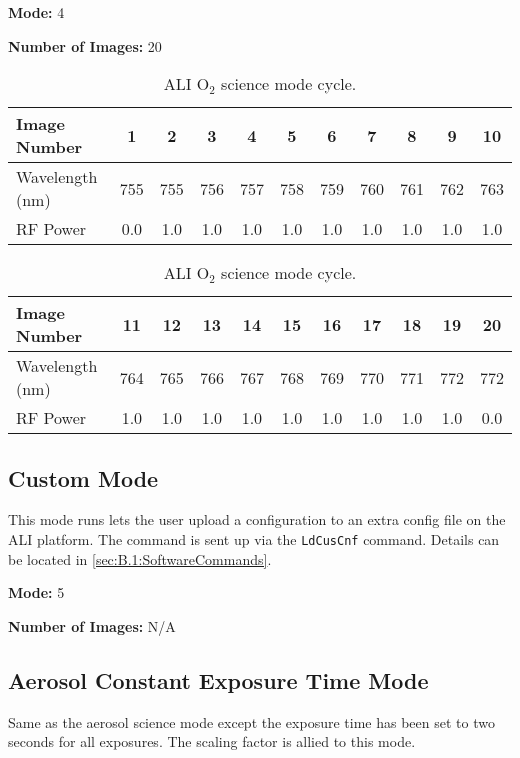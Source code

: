 \textbf{Mode:} 4

\textbf{Number of Images:} 20

\begin{table}
    \begin{center}
    \begin{tabular}{|l|c|c|c|c|c|c|c|c|c|c|}
    \hline
    Image Number & 1 & 2 & 3 & 4 & 5 & 6 & 7 & 8 & 9 & 10 \\
    \hline
    Wavelength (nm) & 755 & 755 & 756 & 757 & 758 & 759 & 760 & 761 & 762 & 763 \\
    \hline
    RF Power & 0.0 & 1.0 & 1.0 & 1.0 & 1.0 & 1.0 & 1.0 & 1.0 & 1.0 & 1.0 \\
    \hline
    \end{tabular}
    \vspace{5mm}
    \begin{tabular}{|l|c|c|c|c|c|c|c|c|c|c|}
    \hline
    Image Number & 11 & 12 & 13 & 14 & 15 & 16 & 17 & 18 & 19 & 20 \\
    \hline
    Wavelength (nm) & 764 & 765 & 766 & 767 & 768 & 769 & 770 & 771 & 772 & 772 \\
    \hline
    RF Power & 1.0 & 1.0 & 1.0 & 1.0 & 1.0 & 1.0 & 1.0 & 1.0 & 1.0 & 0.0 \\
    \hline
    \end{tabular}
    \end{center}
    \caption[ALI O$_{2}$ Science Mode Cycle]{ALI O$_{2}$ science mode cycle.}
    \label{tab:B.2:O2ScienceModes}
\end{table}

\subsection{Custom Mode}

This mode runs lets the user upload a configuration to an extra config file on the ALI platform. The command is sent up via the \texttt{LdCusCnf} command. Details can be located in \autoref{sec:B.1:SoftwareCommands}.

\textbf{Mode:} 5

\textbf{Number of Images:} N/A

\subsection{Aerosol Constant Exposure Time Mode}

Same as the aerosol science mode except the exposure time has been set to two seconds for all exposures. The scaling factor is allied to this mode.

